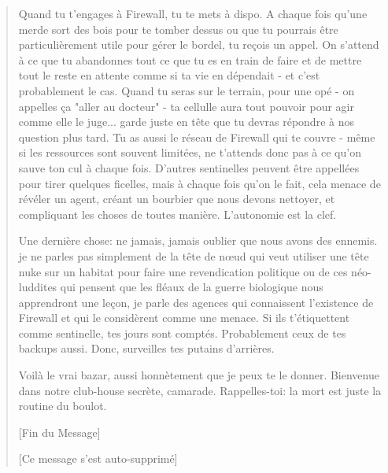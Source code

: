 \begin{quotation}
Quand tu t'engages à Firewall, tu te mets à dispo. A chaque fois qu'une merde
sort des bois pour te tomber dessus ou que tu pourrais être particulièrement
utile pour gérer le bordel, tu reçois un appel. On s'attend à ce que tu
abandonnes tout ce que tu es en train de faire et de mettre tout le reste en
attente comme si ta vie en dépendait - et c'est probablement le cas. Quand tu
seras sur le terrain, pour une opé - on appelles ça "aller au docteur" - ta
cellulle aura tout pouvoir pour agir comme elle le juge... garde juste en
tête que tu devras répondre à nos question plus tard. Tu as aussi le réseau de
Firewall qui te couvre - même si les ressources sont souvent limitées, ne
t'attends donc pas à ce qu'on sauve ton cul à chaque fois. D'autres sentinelles
peuvent être appellées pour tirer quelques ficelles, mais à chaque fois qu'on
le fait, cela menace de révéler un agent, créant un bourbier que nous devons
nettoyer, et compliquant les choses de toutes manière. L'autonomie est la clef. 

Une dernière chose: ne jamais, jamais oublier que nous avons des ennemis. je ne
parles pas simplement de la tête de n\oe{}ud qui veut utiliser une tête nuke sur un
habitat pour faire une revendication politique ou de ces néo-luddites qui
pensent que les fléaux de la guerre biologique nous apprendront une leçon, je
parle des agences qui connaissent l'existence de Firewall et qui le considèrent
comme une menace. Si ils t'étiquettent comme sentinelle, tes jours sont
comptés. Probablement ceux de tes backups aussi. Donc, surveilles tes putains
d'arrières. 

Voilà le vrai bazar, aussi honnètement que je peux te le donner. Bienvenue dans
notre club-house secrète, camarade. Rappelles-toi: la mort est juste la routine
du boulot. 

[Fin du Message] 

[Ce message s'est auto-supprimé]
\end{quotation} 



